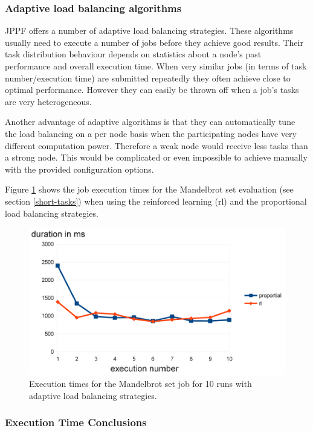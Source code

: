 \documentclass[12pt]{article}
\begin{document}
\subsubsection{Adaptive load balancing algorithms}

JPPF offers a number of adaptive load balancing strategies. These algorithms usually need to execute a number of jobs before they achieve good results. Their task distribution behaviour depends on statistics about a node's past performance and overall execution time. When very similar jobs (in terms of task number/execution time) are submitted repeatedly they often achieve close to optimal performance. However they can easily be thrown off when a job's tasks are very heterogeneous.

Another advantage of adaptive algorithms is that they can automatically tune the load balancing on a per node basis when the participating nodes have very different computation power. Therefore a weak node would receive less tasks than a strong node. This would be complicated or even impossible to achieve manually with the provided configuration options.

Figure \ref{fig:evaluation-learning} shows the job execution times for the Mandelbrot set evaluation (see section \ref{short-tasks}) when using the reinforced learning (rl) and the proportional load balancing strategies.

\begin{figure}[h]
\centering
\includegraphics[scale=0.7]{images/learning-duration.pdf}
\caption{Execution times for the Mandelbrot set job for 10 runs with adaptive load balancing strategies.}
\label{fig:evaluation-learning}
\end{figure}

\subsubsection{Execution Time Conclusions}
\end{document}

